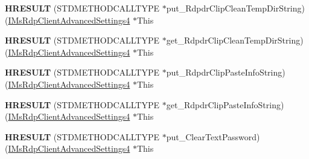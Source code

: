 \begin{DoxyCompactItemize}
\item 
\mbox{\label{struct_m_s_t_s_c_lib_1_1_i_ms_rdp_client_advanced_settings4_vtbl_adb483587aa775b50b67a82df43a322ce}} 
{\bfseries H\+R\+E\+S\+U\+LT} (S\+T\+D\+M\+E\+T\+H\+O\+D\+C\+A\+L\+L\+T\+Y\+PE $\ast$put\+\_\+\+Rdpdr\+Clip\+Clean\+Temp\+Dir\+String)(\hyperlink{interface_m_s_t_s_c_lib_1_1_i_ms_rdp_client_advanced_settings4}{I\+Ms\+Rdp\+Client\+Advanced\+Settings4} $\ast$This
\item 
\mbox{\label{struct_m_s_t_s_c_lib_1_1_i_ms_rdp_client_advanced_settings4_vtbl_ac1fb38ec6fa8f6dcd04afa0febd55e98}} 
{\bfseries H\+R\+E\+S\+U\+LT} (S\+T\+D\+M\+E\+T\+H\+O\+D\+C\+A\+L\+L\+T\+Y\+PE $\ast$get\+\_\+\+Rdpdr\+Clip\+Clean\+Temp\+Dir\+String)(\hyperlink{interface_m_s_t_s_c_lib_1_1_i_ms_rdp_client_advanced_settings4}{I\+Ms\+Rdp\+Client\+Advanced\+Settings4} $\ast$This
\item 
\mbox{\label{struct_m_s_t_s_c_lib_1_1_i_ms_rdp_client_advanced_settings4_vtbl_ab9565cd0b388fbda4c5e51a6b2759844}} 
{\bfseries H\+R\+E\+S\+U\+LT} (S\+T\+D\+M\+E\+T\+H\+O\+D\+C\+A\+L\+L\+T\+Y\+PE $\ast$put\+\_\+\+Rdpdr\+Clip\+Paste\+Info\+String)(\hyperlink{interface_m_s_t_s_c_lib_1_1_i_ms_rdp_client_advanced_settings4}{I\+Ms\+Rdp\+Client\+Advanced\+Settings4} $\ast$This
\item 
\mbox{\label{struct_m_s_t_s_c_lib_1_1_i_ms_rdp_client_advanced_settings4_vtbl_ac8fede0da29b5993bc598490437658e4}} 
{\bfseries H\+R\+E\+S\+U\+LT} (S\+T\+D\+M\+E\+T\+H\+O\+D\+C\+A\+L\+L\+T\+Y\+PE $\ast$get\+\_\+\+Rdpdr\+Clip\+Paste\+Info\+String)(\hyperlink{interface_m_s_t_s_c_lib_1_1_i_ms_rdp_client_advanced_settings4}{I\+Ms\+Rdp\+Client\+Advanced\+Settings4} $\ast$This
\item 
\mbox{\label{struct_m_s_t_s_c_lib_1_1_i_ms_rdp_client_advanced_settings4_vtbl_a0ac30340bb374d4347cf4792917acb37}} 
{\bfseries H\+R\+E\+S\+U\+LT} (S\+T\+D\+M\+E\+T\+H\+O\+D\+C\+A\+L\+L\+T\+Y\+PE $\ast$put\+\_\+\+Clear\+Text\+Password)(\hyperlink{interface_m_s_t_s_c_lib_1_1_i_ms_rdp_client_advanced_settings4}{I\+Ms\+Rdp\+Client\+Advanced\+Settings4} $\ast$This

\end{DoxyCompactItemize}

